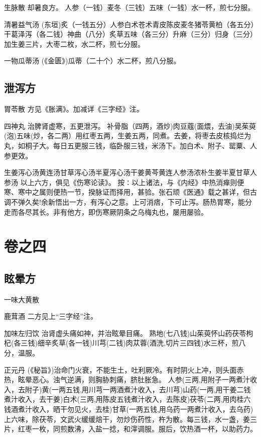 \documentclass[a4paper,12pt,UTF8,twoside]{ctexbook}
\begin{document}
	生脉散
	却暑良方。
	人参（一钱）麦冬（三钱）五味（一钱）水一杯，煎七分服。
	
	清暑益气汤
	(东垣)炙（一钱五分）人参白术苍术青皮陈皮麦冬猪苓黄柏（各五分）干葛泽泻（各二钱）神曲（八分）炙草五味（各三分）升麻（三分）归身（三分）加生姜三片，大枣二枚，水二杯，煎七分服。
	
	一物瓜蒂汤
	(《金匮》)瓜蒂（二十个）水二杯，煎八分服。
	
	
	
	\chapter{泄泻方}
	
	
	胃苓散
	方见《胀满》。加减详《三字经》注。
	
	四神丸
	治脾肾虚寒，五更泄泻。
	补骨脂（四两，酒炒)肉豆蔻(面煨，去油)吴茱萸(泡)五味(炒，各二两）用红枣五两，生姜五两，同煮。去姜，将枣去皮核捣烂为丸，如桐子大。每日五更服三钱，临卧服三钱，米汤下。加白术、附子、罂粟、人参更效。
	
	生姜泻心汤黄连汤甘草泻心汤半夏泻心汤干姜黄芩黄连人参汤浓朴生姜半夏甘草人参汤
	以上六方，俱见《伤寒论读》。
	按∶以上诸法，与《内经》中热消瘅则便寒、寒中之属则便热一节，揆脉证而择用，甚验。张石顽《医通》载之甚详，但古调不弹久矣!余新悟出一方，有泻心之意。上可消痞，下可止泻。肠热胃寒，能分走而各尽其长。非有他方，即伤寒厥阴条之乌梅丸也，屡用屡验。
	
	

	
	\part{卷之四}
	\chapter{眩晕方}	
	
	一味大黄散
	
	鹿茸酒
	二方见上“三字经”注。
	
	加味左归饮
	治肾虚头痛如神，并治眩晕目痛。
	熟地(七八钱)山茱萸怀山药茯苓枸杞(各三钱)细辛炙草(各一钱)川芎(二钱)肉苁蓉(酒洗,切片三四钱)水三杯，煎八分，温服。
	
	正元丹
	(《秘旨》)治命门火衰，不能生土，吐利厥冷。有时阴火上冲，则头面赤热，眩晕恶心。浊气逆满，则胸胁刺痛，脐肚胀急。
	人参(三两,用附子一两煮汁收入，去附子)黄(一两五钱,用川芎一两酒煮汁收入，去川芎)山药(一两,用干姜二钱煮汁收入，去干姜)白术(三两,用陈皮五钱煮汁收入，去陈皮)茯苓(二两,用肉桂六钱酒煮汁收入，晒干勿见火，去桂)甘草(一两五钱,用乌药一两煮汁收入，去乌药)上六味，除茯苓，文武火缓缓焙干，勿炒伤药性，杵为散。每三钱，水一盏，姜三片，红枣一枚，同煎数沸，入盐一捻，和滓调服。服后，饮热酒一杯，以助药力。
	
\end{document}
